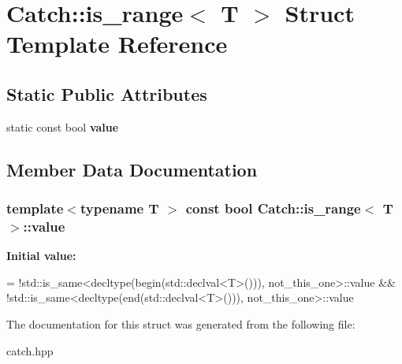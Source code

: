 \hypertarget{structCatch_1_1is__range}{}\section{Catch\+:\+:is\+\_\+range$<$ T $>$ Struct Template Reference}
\label{structCatch_1_1is__range}
\subsection*{Static Public Attributes}
\begin{DoxyCompactItemize}
\item 
static const bool {\bfseries value}
\end{DoxyCompactItemize}


\subsection{Member Data Documentation}
\subsubsection[{\texorpdfstring{value}{value}}]{\setlength{\rightskip}{0pt plus 5cm}template$<$typename T $>$ const bool {\bf Catch\+::is\+\_\+range}$<$ T $>$\+::value\hspace{0.3cm}{\ttfamily [static]}}\hypertarget{structCatch_1_1is__range_afaec39e819c3956829cbbd00feba11be}{}\label{structCatch_1_1is__range_afaec39e819c3956829cbbd00feba11be}
{\bfseries Initial value\+:}
\begin{DoxyCode}
=
            !std::is\_same<decltype(begin(std::declval<T>())), not\_this\_one>::value &&
            !std::is\_same<decltype(end(std::declval<T>())), not\_this\_one>::value
\end{DoxyCode}


The documentation for this struct was generated from the following file\+:\begin{DoxyCompactItemize}
\item 
catch.\+hpp\end{DoxyCompactItemize}
